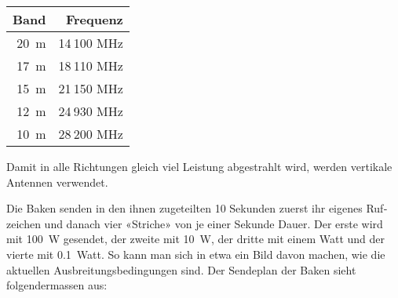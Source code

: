 \vspace{1em}
\begin{tabular}{r r}
\bfseries Band & \bfseries Frequenz \\ \toprule
20 m & 14 100 MHz \\ \midrule                                                                                                                                                                 
17 m & 18 110 MHz \\ \midrule                                                                                                                                                                 
15 m & 21 150 MHz \\ \midrule                                                                                                                                                                 
12 m & 24 930 MHz \\ \midrule                                                                                                                                                                 
10 m & 28 200 MHz \\ \midrule
\end{tabular}
\vspace{1em}

Damit in alle Richtungen gleich viel Leistung abgestrahlt wird, werden vertikale Antennen ver­wendet. 

Die Baken senden in den ihnen zugeteilten 10 Sekunden zuerst ihr eigenes Ruf­zeichen und danach vier «Striche» von je einer Sekunde Dauer. Der erste wird mit 100 W gesendet, der zweite mit 10 W, der dritte mit einem Watt und der vierte mit 0.1 Watt. So kann man sich in etwa ein Bild davon machen, wie die aktuellen Ausbreitungsbedingungen sind.
Der Sendeplan der Baken sieht folgendermassen aus:
\vspace{1em}


